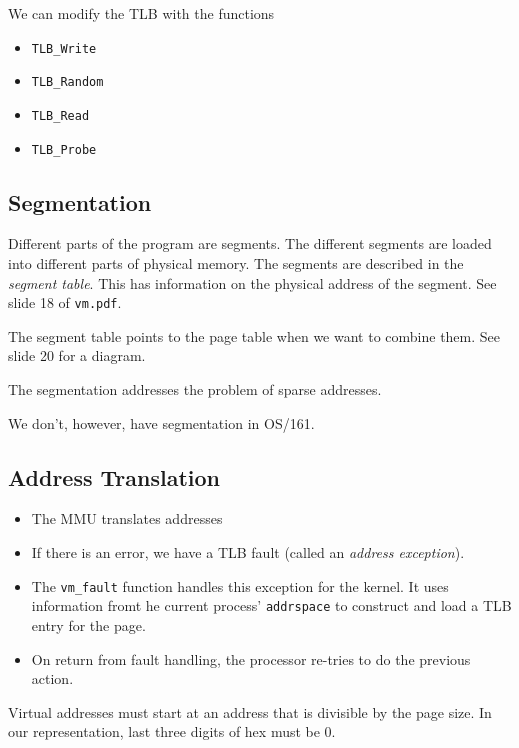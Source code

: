 \documentclass[12pt]{article}
\begin{document}
We can modify the TLB with the functions
\begin{itemize}
	\item \texttt{TLB\_Write}
	\item \texttt{TLB\_Random}
	\item \texttt{TLB\_Read}
	\item \texttt{TLB\_Probe}
\end{itemize}

\subsection{Segmentation}

Different parts of the program are segments. The different segments are loaded
into different parts of physical memory. The segments are described in the
\emph{segment table}. This has information on the physical address of the
segment. See slide 18 of \texttt{vm.pdf}.

The segment table points to the page table when we want to combine them. See
slide 20 for a diagram.

The segmentation addresses the problem of sparse addresses.

We don't, however, have segmentation in OS/161.

\subsection{Address Translation}

\begin{itemize}
	\item The MMU translates addresses
	\item If there is an error, we have a TLB fault (called an \emph{address
		exception}).
	\item The \texttt{vm\_fault} function handles this exception for the kernel.
		It uses information fromt he current process' \texttt{addrspace} to
		construct and load a TLB entry for the page.
	\item On return from fault handling, the processor re-tries to do the
		previous action.
\end{itemize}

Virtual addresses must start at an address that is divisible by the page size.
In our representation, last three digits of hex must be 0.
\end{document}
